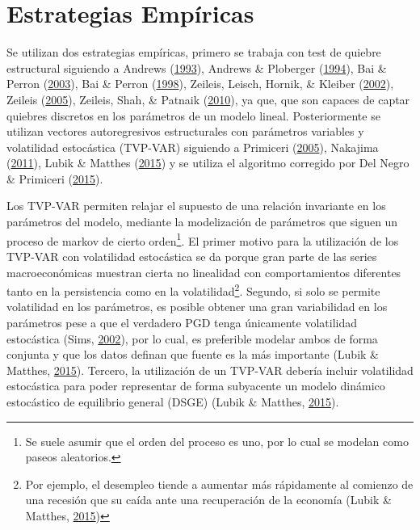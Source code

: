 \documentclass[12pt,oneside]{reedthesis}
\begin{document}
\hypertarget{estrategias-empuxedricas}{%
\section{Estrategias Empíricas}\label{estrategias-empuxedricas}}

Se utilizan dos estrategias empíricas, primero se trabaja con test de quiebre estructural siguiendo a Andrews (\protect\hyperlink{ref-Andrews1993}{1993}), Andrews \& Ploberger (\protect\hyperlink{ref-Andrews1994}{1994}), Bai \& Perron (\protect\hyperlink{ref-BaiPerron2003}{2003}), Bai \& Perron (\protect\hyperlink{ref-BaiPerron1998}{1998}), Zeileis, Leisch, Hornik, \& Kleiber (\protect\hyperlink{ref-Zeileis2002}{2002}), Zeileis (\protect\hyperlink{ref-Zeileis2005}{2005}), Zeileis, Shah, \& Patnaik (\protect\hyperlink{ref-Zeileis2010}{2010}), ya que, que son capaces de captar quiebres discretos en los parámetros de un modelo lineal. Posteriormente se utilizan vectores autoregresivos estructurales con parámetros variables y volatilidad estocástica (TVP-VAR) siguiendo a Primiceri (\protect\hyperlink{ref-Primiceri2005}{2005}), Nakajima (\protect\hyperlink{ref-Nakajima2011}{2011}), Lubik \& Matthes (\protect\hyperlink{ref-Lubik2016b}{2015}) y se utiliza el algoritmo corregido por Del Negro \& Primiceri (\protect\hyperlink{ref-DelNegro2015}{2015}).

Los TVP-VAR permiten relajar el supuesto de una relación invariante en los parámetros del modelo, mediante la modelización de parámetros que siguen un proceso de markov de cierto orden\footnote{Se suele asumir que el orden del proceso es uno, por lo cual se modelan como paseos aleatorios.}. El primer motivo para la utilización de los TVP-VAR con volatilidad estocástica se da porque gran parte de las series macroeconómicas muestran cierta no linealidad con comportamientos diferentes tanto en la persistencia como en la volatilidad\footnote{Por ejemplo, el desempleo tiende a aumentar más rápidamente al comienzo de una recesión que su caída ante una recuperación de la economía (Lubik \& Matthes, \protect\hyperlink{ref-Lubik2016b}{2015})}. Segundo, si solo se permite volatilidad en los parámetros, es posible obtener una gran variabilidad en los parámetros pese a que el verdadero PGD tenga únicamente volatilidad estocástica (Sims, \protect\hyperlink{ref-Sims2002}{2002}), por lo cual, es preferible modelar ambos de forma conjunta y que los datos definan que fuente es la más importante (Lubik \& Matthes, \protect\hyperlink{ref-Lubik2016b}{2015}). Tercero, la utilización de un TVP-VAR debería incluir volatilidad estocástica para poder representar de forma subyacente un modelo dinámico estocástico de equilibrio general (DSGE) (Lubik \& Matthes, \protect\hyperlink{ref-Lubik2016b}{2015}).
\end{document}
